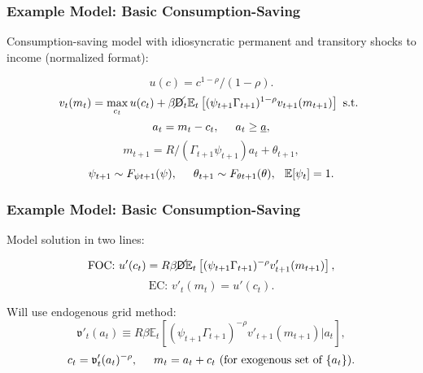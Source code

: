 \documentclass[11ptt]{beamer}
\newcommand{\E}{\mathbb{E}}
\newcommand{\Die}{\mathsf{D}}
\newcommand{\Live}{\cancel{\Die}}
\begin{document}
\begin{frame}\label{ModelMath}
\frametitle{Example Model: Basic Consumption-Saving}

Consumption-saving model with idiosyncratic permanent and transitory shocks to income (normalized format):

\begin{equation*}
u(c) = c^{1-\rho}/(1-\rho).
\end{equation*}
\begin{equation*}
v_t(m_t) = \max_{c_t} u(c_t) + \beta \Live_t \E_t \left[(\psi_{t+1} \Gamma_{t+1})^{1-\rho} v_{t+1}(m_{t+1}) \right] \text{ s.t. }
\end{equation*}
\begin{equation*}
a_t = m_t - c_t, \hspace{0.5cm} a_t \geq \underline{a},
\end{equation*}
\begin{equation*}
m_{t+1} = R/(\Gamma_{t+1} \psi_{t+1}) a_t + \theta_{t+1}, 
\end{equation*}
\begin{equation*}
\psi_{t+1} \sim F_{\psi t+1}(\psi), \hspace{0.5cm} \theta_{t+1} \sim F_{\theta t+1}(\theta), \hspace{0.25cm} \E[\psi_t] = 1.
\end{equation*}
\end{frame}



\begin{frame}
\frametitle{Example Model: Basic Consumption-Saving}

Model solution in two lines:

\begin{equation*}
\text{FOC: } u'(c_t) = R \beta \Live \E_t \left[(\psi_{t+1} \Gamma_{t+1})^{-\rho} v'_{t+1}(m_{t+1}) \right],
\end{equation*}
\begin{equation*}
\text{EC: } v'_t(m_t) = u'(c_t).
\end{equation*}

Will use endogenous grid method:
\begin{equation*}
\mathfrak{v}'_t(a_t) \equiv R \beta \E_t \left[(\psi_{t+1} \Gamma_{t+1})^{-\rho} v'_{t+1}(m_{t+1}) | a_t\right],
\end{equation*}
\begin{equation*}
c_t = \mathfrak{v}'_t(a_t)^{-\rho}, \hspace{0.5cm} m_t = a_t + c_t \text{ (for exogenous set of } \{a_t\} \text{)}.
\end{equation*}

\hyperlink{ModelStatement}{}
\end{frame}
\end{document}
